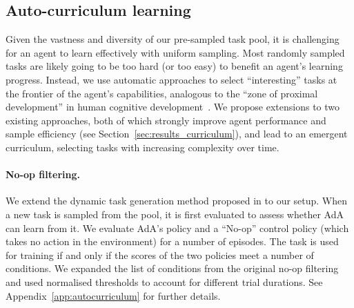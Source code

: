\documentclass[11pt, a4paper, logo, copyright]{deepmind}
\begin{document}
\subsection{Auto-curriculum learning} \label{sec:methods_auto_curriculum}
Given the vastness and diversity of our pre-sampled task pool, it is challenging for an agent to learn effectively with uniform sampling. Most randomly sampled tasks are likely going to be too hard (or too easy) to benefit an agent's learning progress. Instead, we use automatic approaches to select ``interesting'' tasks at the frontier of the agent's capabilities, analogous to the ``zone of proximal development'' in human cognitive development~\citep{vygotsky1978}. We propose extensions to two existing approaches, both of which strongly improve agent performance and sample efficiency (see Section~\ref{sec:results_curriculum}), and lead to an emergent curriculum, selecting tasks with increasing complexity over time.
\paragraph{No-op filtering.} We extend the dynamic task generation method proposed in \citet[Section~5.2]{xland} to our setup. When a new task is sampled from the pool, it is first evaluated to assess whether AdA can learn from it. We evaluate AdA's policy and a ``No-op'' control policy (which takes no action in the environment) for a number of episodes. The task is used for training if and only if the scores of the two policies meet a number of conditions. We expanded the list of conditions from the original no-op filtering and used normalised thresholds to account for different trial durations. See Appendix~\ref{app:autocurriculum} for further details.
\end{document}

